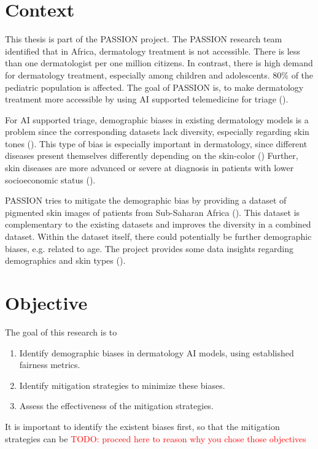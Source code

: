 \documentclass[a4paper,12pt]{report}
\renewcommand{\todo}[1]{\textcolor{red}{TODO: #1}}
\begin{document}
		\section{Context}
			This thesis is part of the PASSION project. The PASSION research team identified that in Africa, dermatology treatment is not accessible. There is less than one dermatologist per one million citizens. In contrast, there is high demand for dermatology treatment, especially among children and adolescents. 80\% of the \gls{pediatric} population is affected. The goal of PASSION is, to make dermatology treatment more accessible by using AI supported telemedicine for triage (\cite{Gottfrois2024}).
		
			For AI supported triage, demographic biases in existing dermatology models is a problem since the corresponding datasets lack diversity, especially regarding skin tones (\cite{Gottfrois2024}). This type of bias is especially important in dermatology, since different diseases present themselves differently depending on the skin-color (\cite{Diaz2022}) Further, skin diseases are more advanced or severe at diagnosis in patients with lower socioeconomic status (\cite{BAD2021}).
			
			PASSION tries to mitigate the demographic bias by providing a dataset of pigmented skin images of patients from Sub-Saharan Africa (\cite{Gottfrois2024}). This dataset is complementary to the existing datasets and improves the diversity in a combined dataset. Within the dataset itself, there could potentially be further demographic biases, e.g. related to age. The project provides some data insights regarding demographics and skin types (\cite{Gottfrois2024}).
			 
		\section{Objective}
		The goal of this research is to
		\begin{enumerate}
			\item Identify demographic biases in dermatology AI models, using established fairness metrics.
			\item Identify mitigation strategies to minimize these biases.
			\item Assess the effectiveness of the mitigation strategies.
		\end{enumerate}
		It is important to identify the existent biases first, so that the mitigation strategies can be \todo{proceed here to reason why you chose those objectives}
		
\end{document}
